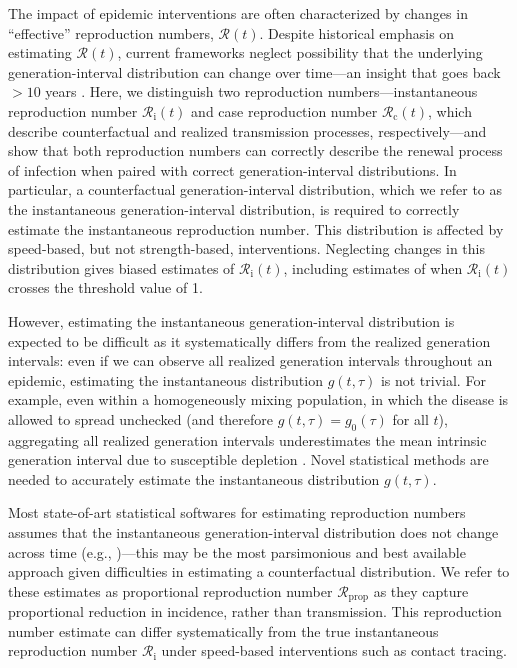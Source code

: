 \documentclass[12pt]{article}
\newcommand{\Rx}[1]{\ensuremath{{\mathcal R}_{#1}}\xspace}
\newcommand{\Rc}{\Rx{\mathrm{c}}}
\newcommand{\Ri}{\Rx{\mathrm{i}}}
\newcommand{\RR}{\ensuremath{{\mathcal R}}\xspace}
\newcommand{\Rprop}{\Rx{\mathrm{prop}}}
\begin{document}
The impact of epidemic interventions are often characterized by changes in ``effective'' reproduction numbers, $\RR(t)$.
Despite historical emphasis on estimating $\RR(t)$, current frameworks neglect possibility that the underlying generation-interval distribution can change over time---an insight that goes back $>10$ years \citep{fraser2007estimating}.
Here, we distinguish two reproduction numbers---instantaneous reproduction number $\Ri(t)$ and case reproduction number $\Rc(t)$, which describe counterfactual and realized transmission processes, respectively---and show that both reproduction numbers can correctly describe the renewal process of infection when paired with correct generation-interval distributions.
In particular, a counterfactual generation-interval distribution, which we refer to as the instantaneous generation-interval distribution, is required to correctly estimate the instantaneous reproduction number. 
This distribution is affected by speed-based, but not strength-based, interventions.
Neglecting changes in this distribution gives biased estimates of $\Ri(t)$, including estimates of when $\Ri(t)$ crosses the threshold value of 1.

However, estimating the instantaneous generation-interval distribution is expected to be difficult as it systematically differs from the realized generation intervals: even if we can observe all realized generation intervals throughout an epidemic, estimating the instantaneous distribution $g(t, \tau)$ is not trivial.
For example, even within a homogeneously mixing population, in which the disease is allowed to spread unchecked (and therefore $g(t, \tau) = g_0(\tau)$ for all $t$), aggregating all realized generation intervals underestimates the mean intrinsic generation interval due to susceptible depletion \citep{park2020inferring}.
Novel statistical methods are needed to accurately estimate the instantaneous distribution $g(t, \tau)$.

Most state-of-art statistical softwares for estimating reproduction numbers assumes that the instantaneous generation-interval distribution does not change across time (e.g., \citep{10.12688/wellcomeopenres.16006.2,flaxman2020estimating,brauner2021inferring})---this may be the most parsimonious and best available approach given difficulties in estimating a counterfactual distribution.
We refer to these estimates as proportional reproduction number $\Rprop$ as they capture proportional reduction in incidence, rather than transmission.
This reproduction number estimate can differ systematically from the true instantaneous reproduction number $\Ri$ under speed-based interventions such as contact tracing.
\end{document}

